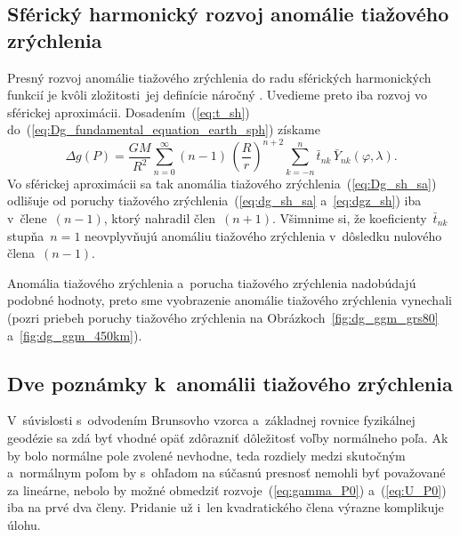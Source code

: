 \documentclass[a4paper, 12pt]{book}
\begin{document}
\subsection{Sférický harmonický rozvoj anomálie tiažového zrýchlenia}

Presný rozvoj anomálie tiažového zrýchlenia do radu sférických harmonických 
funkcií je kvôli zložitosti~jej definície náročný \parencite[pozri 
napríklad][]{Barthelmes2013}.  Uvedieme preto iba rozvoj vo sférickej 
aproximácii.  Dosadením~(\ref{eq:t_sh}) 
do~(\ref{eq:Dg_fundamental_equation_earth_sph}) získame
%
\begin{equation}
\label{eq:Dg_sh_sa}
\Delta g(P) = \frac{GM}{R^2} \sum_{n = 0}^\infty (n - 1) \, \left( \frac{R}{r} 
\right)^{n + 2} \sum_{k = -n}^{n} \bar{t}_{nk} \, \bar{Y}_{nk}(\varphi, 
\lambda){.}
\end{equation}
%
Vo sférickej aproximácii sa tak anomália tiažového 
zrýchlenia~(\ref{eq:Dg_sh_sa}) odlišuje od poruchy tiažového 
zrýchlenia~(\ref{eq:dg_sh_sa} a~\ref{eq:dgz_sh}) iba v~člene~$(n - 1)$, ktorý 
nahradil člen~$(n + 1)$.  Všimnime si, že  koeficienty~$\bar{t}_{nk}$ stupňa~$n 
= 1$ neovplyvňujú anomáliu tiažového zrýchlenia v~dôsledku nulového člena~$(n 
- 1)$.

Anomália tiažového zrýchlenia a~porucha tiažového zrýchlenia nadobúdajú podobné 
hodnoty, preto sme vyobrazenie anomálie tiažového zrýchlenia vynechali (pozri 
priebeh poruchy tiažového zrýchlenia na Obrázkoch~\ref{fig:dg_ggm_grs80} 
a~\ref{fig:dg_ggm_450km}).



\subsection*{Dve poznámky k~anomálii tiažového zrýchlenia}

V~súvislosti s~odvodením Brunsovho vzorca a~základnej rovnice fyzikálnej 
geodézie sa zdá byť vhodné opäť zdôrazniť dôležitosť voľby normálneho poľa.  Ak 
by bolo normálne pole zvolené nevhodne, teda rozdiely medzi skutočným 
a~normálnym poľom by s~ohľadom na súčasnú presnosť nemohli byť považované za 
lineárne, nebolo by možné obmedziť rozvoje~(\ref{eq:gamma_P0}) 
a~(\ref{eq:U_P0}) iba na prvé dva členy.  Pridanie už i~len kvadratického člena 
výrazne komplikuje úlohu.
\end{document}
